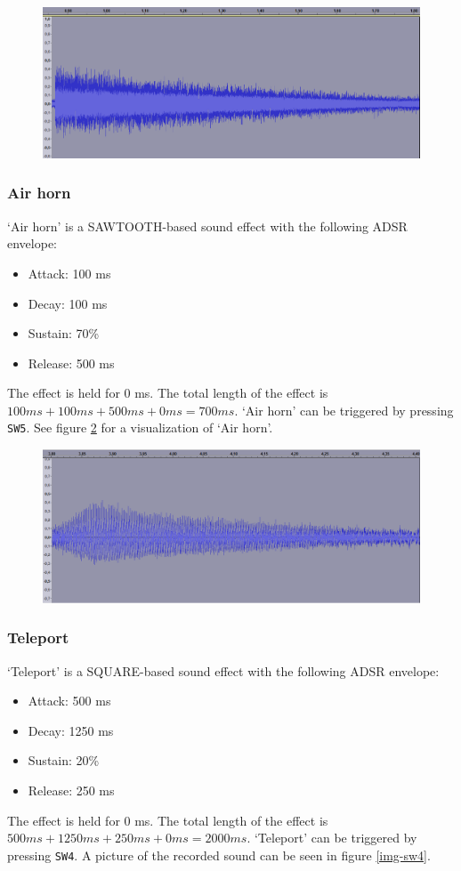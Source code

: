 \begin{figure}[H]
	\includegraphics[width = \textwidth]{images/SW6.png}
	\caption{}
	\label{img-sw6}
\end{figure}


\subsubsection{Air horn}
`Air horn' is a SAWTOOTH-based sound effect with the following ADSR envelope:
\begin{itemize}
	\item{Attack: 100 ms}
	\item{Decay: 100 ms}
	\item{Sustain: 70\%}
	\item{Release: 500 ms}
\end{itemize}
The effect is held for 0 ms.
The total length of the effect is $100 ms + 100 ms + 500 ms + 0 ms = 700 ms$.
`Air horn' can be triggered by pressing \texttt{SW5}.
See figure \ref{img-sw5} for a visualization of `Air horn'.

\begin{figure}[H]
	\includegraphics[width = \textwidth]{images/SW5.png}
	\caption{}
	\label{img-sw5}
\end{figure}

\subsubsection{Teleport}
`Teleport' is a SQUARE-based sound effect with the following ADSR envelope:
\begin{itemize}
	\item{Attack: 500 ms}
	\item{Decay: 1250 ms}
	\item{Sustain: 20\%}
	\item{Release: 250 ms}
\end{itemize}
The effect is held for 0 ms.
The total length of the effect is $500 ms + 1250 ms + 250 ms + 0 ms = 2000 ms$.
`Teleport' can be triggered by pressing \texttt{SW4}.
A picture of the recorded sound can be seen in figure \ref{img-sw4}.

